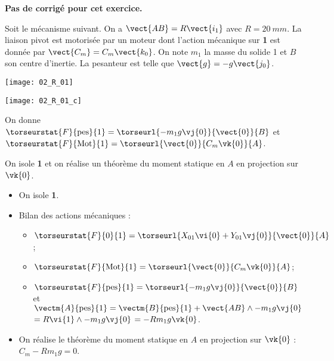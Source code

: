\normaltrue
\correctiontrue


\setcounter{numques}{0}

\ifcorrection
\else
\textbf{Pas de corrigé pour cet exercice.}
\fi

\ifprof
\else
Soit le mécanisme suivant. On a $\vect{AB}=R\vect{i_1}$ avec $R=\SI{20}{mm}$. La liaison pivot est motorisée par un moteur dont l'action mécanique sur \textbf{1} est donnée par $\vect{C_m}=C_m \vect{k_0}$.
On note $m_1$ la masse du solide 1 et $B$ son centre d'inertie. 
 La pesanteur est telle que $\vect{g}=-g\vect{j_0}$.

\begin{center}
\texttt{[image: 02\_R\_01]}
\end{center}
\fi

\ifprof

\begin{center}
\texttt{[image: 02\_R\_01\_c]}
\end{center}
\else
\fi

\ifprof

\else
On donne 
$\torseurstat{F}{\text{pes}}{1}=\torseurl{-m_1g\vj{0}}{\vect{0}}{B}$ et
$\torseurstat{F}{\text{Mot}}{1}=\torseurl{\vect{0}}{C_m\vk{0}}{A}$.

On isole \textbf{1} et on réalise un théorème du moment statique en $A$ en projection sur $\vk{0}$.
\fi

\ifprof

\begin{itemize}
\item On isole \textbf{1}.
\item Bilan des actions mécaniques : 
\begin{itemize}
\item $\torseurstat{F}{0}{1}=\torseurl{X_{01}\vi{0}+Y_{01}\vj{0}}{\vect{0}}{A}$;
\item $\torseurstat{F}{\text{Mot}}{1}=\torseurl{\vect{0}}{C_m\vk{0}}{A}$;
\item $\torseurstat{F}{\text{pes}}{1}=\torseurl{-m_1g\vj{0}}{\vect{0}}{B}$ et 
$\vectm{A}{\text{pes}}{1} = \vectm{B}{\text{pes}}{1} + \vect{AB}\wedge -m_1g\vj{0}$
$=  R\vi{1}\wedge -m_1g\vj{0}$ $=  -Rm_1g\vk{0}$.
\end{itemize}
\item On réalise le théorème du moment statique en $A$ en projection sur $\vk{0}$ :
$C_m  -Rm_1g = 0$.
\end{itemize}
\else
\fi


